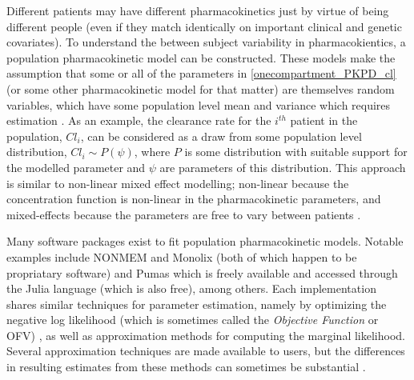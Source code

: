 Different patients may have different pharmacokinetics just by virtue of being different people (even if they match identically on important clinical and genetic covariates).  To understand the between subject variability in pharmacokientics, a population pharmacokinetic model can be constructed.  These models make the assumption that some or all of the parameters in \cref{onecompartment_PKPD_cl} (or some other pharmacokinetic model for that matter) are themselves random variables, which have some population level mean and variance which requires estimation \cite{owen2014introduction}.  As an example, the clearance rate for the $i^{th}$ patient in the population, $\mathit{Cl}_i$, can be considered as a draw from some population level distribution, $\mathit{Cl}_i \sim P(\psi) $, where $P$ is some distribution with suitable support for the modelled parameter and $\psi$ are parameters of this distribution.  This approach is similar to non-linear mixed effect modelling; non-linear because the concentration function is non-linear in the pharmacokinetic parameters, and mixed-effects because the parameters are free to vary between patients \cite{owen2014introduction, mould2013basic}.

Many software packages exist to fit population pharmacokinetic models.  Notable examples  include NONMEM \cite{bauer2011nonmem} and Monolix \cite{noauthor_monolix_nodate} (both of which happen to be propriatary software) and Pumas \cite{rackauckas2020accelerated} which is freely available and accessed through the Julia language (which is also free), among others.  Each implementation shares similar techniques for parameter estimation, namely by optimizing the negative log likelihood (which is sometimes called the \textit{Objective Function} or OFV) \cite{bauer2011nonmem, mould2013basic, bauer_nonmem_2019}, as well as approximation methods for computing the marginal likelihood.  Several approximation techniques are made available to users, but the differences in resulting estimates from these methods can sometimes be substantial \cite{mould2013basic}.
